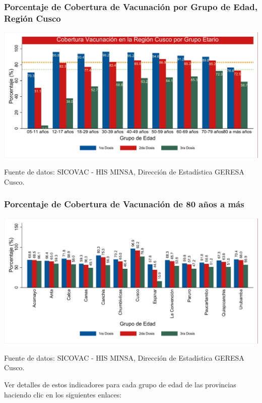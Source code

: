\documentclass[xcolor=table]{beamer}
\begin{document}
\begin{frame}[label=cobertura_vacuna]
	\frametitle{Porcentaje de Cobertura de Vacunación por Grupo de Edad, Región Cusco}
	\vspace{-.5cm}
	\begin{center}
		\includegraphics[width=0.9\linewidth, trim={.2cm .5cm .2cm .2cm},clip]{../figuras/vacunacion_grupo_edad_dosis.pdf}
	\end{center}
	{\tiny Fuente de datos: SICOVAC - HIS MINSA, Dirección de Estadística GERESA Cusco.} 
\end{frame}

\begin{frame}[label=cobertura_vacuna_provincias]
	\frametitle{Porcentaje de Cobertura de Vacunación de 80 años a más}
	\vspace{-.5cm}
	\begin{center}
		\includegraphics[width=0.85\linewidth, trim={.2cm .5cm .2cm .2cm},clip]{../figuras/vacunacion_provincial_edad_practica_9.pdf}
	\end{center}
	{\tiny Fuente de datos: SICOVAC - HIS MINSA, Dirección de Estadística GERESA Cusco.} \hyperlink{indice}{}
	
	Ver detalles de estos indicadores para cada grupo de edad de las provincias haciendo clic en los siguientes enlaces:
	\hyperlink{vacunas_90}{}
	\hyperlink{vacunas_80}{}
	\hyperlink{vacunas_70}{}
	\hyperlink{vacunas_60}{} \hyperlink{vacunas_50}{} \hyperlink{vacunas_40}{} \hyperlink{vacunas_30}{}
	\hyperlink{vacunas_20}{} \hyperlink{vacunas_10}{}
	
\end{frame}
\end{document}
